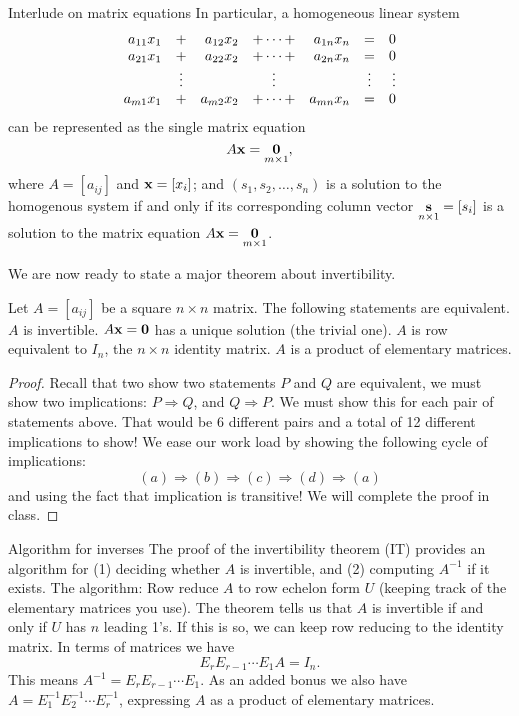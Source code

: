 \begin{frame}{Interlude on matrix equations}
In particular, a homogeneous linear system 
\[
\begin{array}{rcrcrcr} a_{11}x_{1}&+&a_{12}x_{2}&+\cdots+& a_{1n}x_{n}&=&0\\ a_{21}x_{1}&+&a_{22}x_{2}&+\cdots+&a_{2n}x_{n}&=&0\\ &\vdots& &\vdots & &\vdots & \vdots\\ a_{m1}x_{1}&+&a_{m2}x_{2}&+\cdots +&a_{mn}x_{n}&=&0 \end{array}
\]
can be represented as the single matrix equation 
\[
A{\mathbf x}=\underset{m\times 1}{{\mathbf 0}},
\]
where $A=[a_{ij}]$ and ${\mathbf x}=[x_i]$; and $(s_1,s_2,\dots, s_n)$ is a solution to the \alert{homogenous system} if and only if its corresponding column vector $\underset{n\times 1}{{\mathbf s}}=[s_i]$ is a solution to the \alert{matrix equation} $A{\mathbf x}=\underset{m\times 1}{{\mathbf 0}}$. 
\end{frame}

\begin{frame}
We are now ready to state a major theorem about invertibility. 
\begin{theorem}
Let $A=[a_{ij}]$ be a square $n\times n$ matrix. The following statements are equivalent.
\bb[(a)]
\ii $A$ is invertible.
\pause\ii $A{\mathbf x}={\mathbf 0}$ has a unique solution (the trivial one). 
\pause\ii $A$ is row equivalent to $I_n$, the $n\times n$ identity matrix.
\pause\ii $A$ is a product of elementary matrices. 	
\ee
\end{theorem}
\pause\begin{proof}
\footnotesize
Recall that two show two statements $P$ and $Q$ are equivalent, we must show two implications: $P\Rightarrow Q$, and $Q\Rightarrow P$. 
\bpause We must show this for each pair of statements above. That would be 6 different pairs and a total of 12 different implications to show! 
\bspace We ease our work load by showing the following \alert{cycle} of implications:
\[
(a)\Rightarrow(b)\Rightarrow(c)\Rightarrow(d)\Rightarrow(a)
\]
and using the fact that implication is transitive! 
\bspace 
We will complete the proof in class. 
\end{proof}
\end{frame}
\begin{frame}{Algorithm for inverses}
The proof of the invertibility theorem (IT) provides an algorithm for (1) deciding whether $A$ is invertible, and (2) computing $A^{-1}$ if it exists. 
\bpause
The algorithm:
\bb
\ii Row reduce $A$ to row echelon form $U$ (keeping track of the elementary matrices you use). The theorem tells us that $A$ is invertible if and only if $U$ has $n$ leading 1's. 
\pause\ii If this is so, we can keep row reducing to the identity matrix. In terms of matrices we have 
\[
E_rE_{r-1}\cdots E_1A=I_n.
\] 
This means $A^{-1}=E_rE_{r-1}\cdots E_1$.
\pause\ii As an added bonus we also have $A=E_1^{-1}E_2^{-1}\cdots E_{r}^{-1}$, expressing $A$ as a product of elementary matrices. 
\ee
\end{frame}
